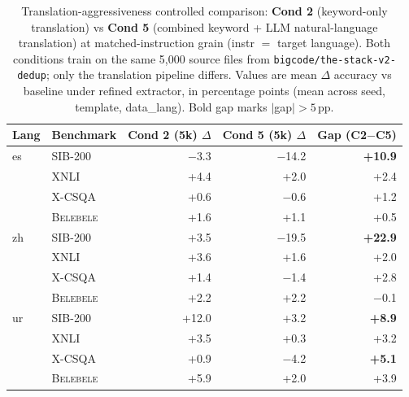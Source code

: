 \begin{table}[t]
  \centering
  \small
  \begin{tabular}{llrrr}
    \toprule
    Lang & Benchmark & Cond 2 (5k) $\Delta$ & Cond 5 (5k) $\Delta$ & Gap (C2$-$C5) \\
    \midrule
    es & \textsc{SIB-200} & $-$3.3 & $-$14.2 & \textbf{+10.9} \\
     & \textsc{XNLI} & +4.4 & +2.0 & +2.4 \\
     & \textsc{X-CSQA} & +0.6 & $-$0.6 & +1.2 \\
     & \textsc{Belebele} & +1.6 & +1.1 & +0.5 \\
    zh & \textsc{SIB-200} & +3.5 & $-$19.5 & \textbf{+22.9} \\
     & \textsc{XNLI} & +3.6 & +1.6 & +2.0 \\
     & \textsc{X-CSQA} & +1.4 & $-$1.4 & +2.8 \\
     & \textsc{Belebele} & +2.2 & +2.2 & $-$0.1 \\
    ur & \textsc{SIB-200} & +12.0 & +3.2 & \textbf{+8.9} \\
     & \textsc{XNLI} & +3.5 & +0.3 & +3.2 \\
     & \textsc{X-CSQA} & +0.9 & $-$4.2 & \textbf{+5.1} \\
     & \textsc{Belebele} & +5.9 & +2.0 & +3.9 \\
    \bottomrule
  \end{tabular}
  \caption{Translation-aggressiveness controlled comparison: \textbf{Cond 2} (keyword-only translation) vs \textbf{Cond 5} (combined keyword + LLM natural-language translation) at matched-instruction grain (instr $=$ target language). Both conditions train on the same 5{,}000 source files from \texttt{bigcode/the-stack-v2-dedup}; only the translation pipeline differs. Values are mean $\Delta$ accuracy vs baseline under refined extractor, in percentage points (mean across seed, template, data\_lang). Bold gap marks $|$gap$| > 5$\,pp.}
  \label{tab:cond2-vs-cond5}
\end{table}


